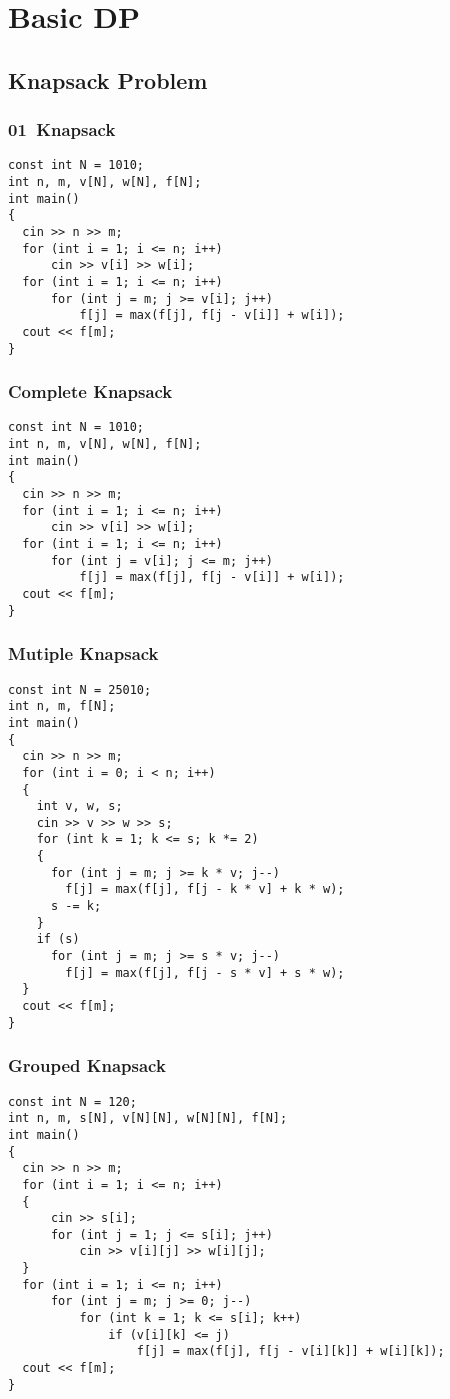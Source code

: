 \chapter{Basic DP}\label{chap:BasicDP}
\section{Knapsack Problem}
\subsection{01\ Knapsack}
\begin{lstlisting}
const int N = 1010;
int n, m, v[N], w[N], f[N];
int main()
{
  cin >> n >> m;
  for (int i = 1; i <= n; i++)
      cin >> v[i] >> w[i];
  for (int i = 1; i <= n; i++)
      for (int j = m; j >= v[i]; j++)
          f[j] = max(f[j], f[j - v[i]] + w[i]);
  cout << f[m];
}
\end{lstlisting}
\subsection{Complete Knapsack}
\begin{lstlisting}
const int N = 1010;
int n, m, v[N], w[N], f[N];
int main()
{
  cin >> n >> m;
  for (int i = 1; i <= n; i++)
      cin >> v[i] >> w[i];
  for (int i = 1; i <= n; i++)
      for (int j = v[i]; j <= m; j++)
          f[j] = max(f[j], f[j - v[i]] + w[i]);
  cout << f[m];
}
\end{lstlisting}
\subsection{Mutiple Knapsack}
\begin{lstlisting}
const int N = 25010;
int n, m, f[N];
int main()
{
  cin >> n >> m;
  for (int i = 0; i < n; i++)
  {
    int v, w, s;
    cin >> v >> w >> s;
    for (int k = 1; k <= s; k *= 2)
    {
      for (int j = m; j >= k * v; j--)
        f[j] = max(f[j], f[j - k * v] + k * w);
      s -= k;
    }
    if (s)
      for (int j = m; j >= s * v; j--)
        f[j] = max(f[j], f[j - s * v] + s * w);
  }
  cout << f[m];
}
\end{lstlisting}
\subsection{Grouped Knapsack}
\begin{lstlisting}
const int N = 120;
int n, m, s[N], v[N][N], w[N][N], f[N];
int main()
{
  cin >> n >> m;
  for (int i = 1; i <= n; i++)
  {
      cin >> s[i];
      for (int j = 1; j <= s[i]; j++)
          cin >> v[i][j] >> w[i][j];
  }
  for (int i = 1; i <= n; i++)
      for (int j = m; j >= 0; j--)
          for (int k = 1; k <= s[i]; k++)
              if (v[i][k] <= j)
                  f[j] = max(f[j], f[j - v[i][k]] + w[i][k]);
  cout << f[m];
}
\end{lstlisting}
